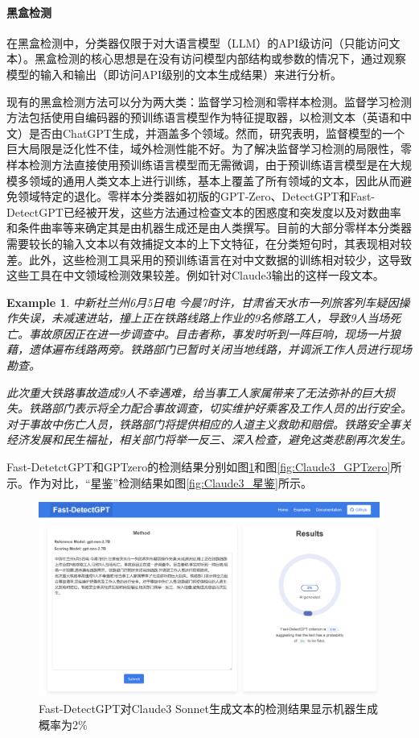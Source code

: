 \documentclass[a4paper]{report}
\newtheorem{example}{Example}
\begin{document}
\paragraph{黑盒检测}
在黑盒检测中，分类器仅限于对大语言模型（LLM）的API级访问（只能访问文本）。黑盒检测的核心思想是在没有访问模型内部结构或参数的情况下，通过观察模型的输入和输出（即访问API级别的文本生成结果）来进行分析。

现有的黑盒检测方法可以分为两大类：监督学习检测和零样本检测。监督学习检测方法包括使用自编码器的预训练语言模型作为特征提取器，以检测文本（英语和中文）是否由ChatGPT生成，并涵盖多个领域。然而，研究表明，监督模型的一个巨大局限是泛化性不佳，域外检测性能不好\cite{chakraborty2023possibilities}。为了解决监督学习检测的局限性，零样本检测方法直接使用预训练语言模型而无需微调，由于预训练语言模型是在大规模多领域的通用人类文本上进行训练，基本上覆盖了所有领域的文本，因此从而避免领域特定的退化。零样本分类器如初版的GPT-Zero、DetectGPT\cite{mitchell2023detectgpt}和Fast-DetectGPT\cite{bao2023fast}已经被开发，这些方法通过检查文本的困惑度和突发度以及对数曲率和条件曲率等来确定其是由机器生成还是由人类撰写。目前的大部分零样本分类器需要较长的输入文本以有效捕捉文本的上下文特征，在分类短句时，其表现相对较差。此外，这些检测工具采用的预训练语言在对中文数据的训练相对较少，这导致这些工具在中文领域检测效果较差。例如针对Claude3输出的这样一段文本。
\begin{example}
	中新社兰州6月5日电 今晨7时许，甘肃省天水市一列旅客列车疑因操作失误，未减速进站，撞上正在铁路线路上作业的9名修路工人，导致9人当场死亡。事故原因正在进一步调查中。目击者称，事发时听到一阵巨响，现场一片狼藉，遗体遍布线路两旁。铁路部门已暂时关闭当地线路，并调派工作人员进行现场勘查。

	此次重大铁路事故造成9人不幸遇难，给当事工人家属带来了无法弥补的巨大损失。铁路部门表示将全力配合事故调查，切实维护好乘客及工作人员的出行安全。对于事故中伤亡人员，铁路部门将提供相应的人道主义救助和赔偿。铁路安全事关经济发展和民生福祉，相关部门将举一反三、深入检查，避免这类悲剧再次发生。
\end{example}Fast-DetetctGPT和GPTzero的检测结果分别如图\ref{fig:Claude3_Fast-DetectGPT}和图\ref{fig:Claude3_GPTzero}所示。作为对比，“星鉴”检测结果如图\ref{fig:Claude3_星鉴}所示。
\begin{figure}[H]
	\centering
	\includegraphics[width=\textwidth]{figures/Claude3_Fast-DetectGPT.png}
	\caption{Fast-DetectGPT对Claude3 Sonnet生成文本的检测结果显示机器生成概率为2\%}
	\label{fig:Claude3_Fast-DetectGPT}
\end{figure}
\end{document}
